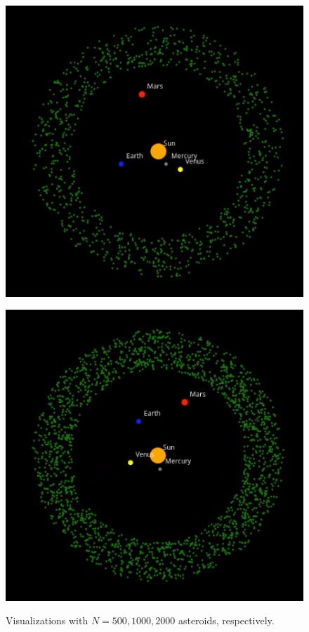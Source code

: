 \documentclass{article}
\begin{document}
\begin{figure}[H]
\begin{minipage}{0.3\textwidth}
        \includegraphics[width=\textwidth]{1000asteroids.png}
        \label{fig:image2}
    \end{minipage}
    \hfill
    \begin{minipage}{0.3\textwidth}
        \centering
        \includegraphics[width=\textwidth]{2000asteroids.png}
        \label{fig:image3}
    \end{minipage}
    \caption{Visualizations with $N=500, 1000,2000$ asteroids, respectively.}
\end{figure}
\end{document}
